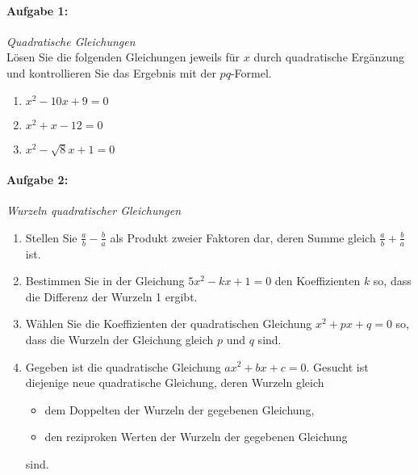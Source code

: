 
\paragraph{Aufgabe 1: } \emph{Quadratische Gleichungen}\\[0.2cm]
Lösen Sie die folgenden Gleichungen jeweils für $x$ durch quadratische Ergänzung und kontrollieren Sie das Ergebnis mit der $pq$-Formel.
\begin{enumerate}[label=(\alph*)]
    \item $x^2-10x+9=0$
    \item $x^2+x-12=0$
    \item $x^2-\sqrt{8}x+1=0$
\end{enumerate}

\paragraph{Aufgabe 2: } \emph{Wurzeln quadratischer Gleichungen}
\begin{enumerate}[label=(\alph*)]
    \item Stellen Sie $\textstyle\frac{a}{b}-\frac{b}{a}$ als Produkt zweier Faktoren dar, deren Summe gleich $\textstyle\frac{a}{b}+\frac{b}{a}$ ist.
    \item Bestimmen Sie in der Gleichung $5x^2-kx+1=0$ den Koeffizienten $k$ so, dass die Differenz der Wurzeln 1 ergibt.
    \item Wählen Sie die Koeffizienten der quadratischen Gleichung $x^2+px+q=0$ so, dass die Wurzeln der Gleichung gleich $p$ und $q$ sind.
    \item Gegeben ist die quadratische Gleichung $ax^2+bx+c=0$. Gesucht ist diejenige neue quadratische Gleichung, deren Wurzeln gleich
    \begin{itemize}[labelindent=1em,labelsep=0.5cm]
        \item dem Doppelten der Wurzeln der gegebenen Gleichung,
        \item den reziproken Werten der Wurzeln der gegebenen Gleichung
    \end{itemize}
    sind.
\end{enumerate}

